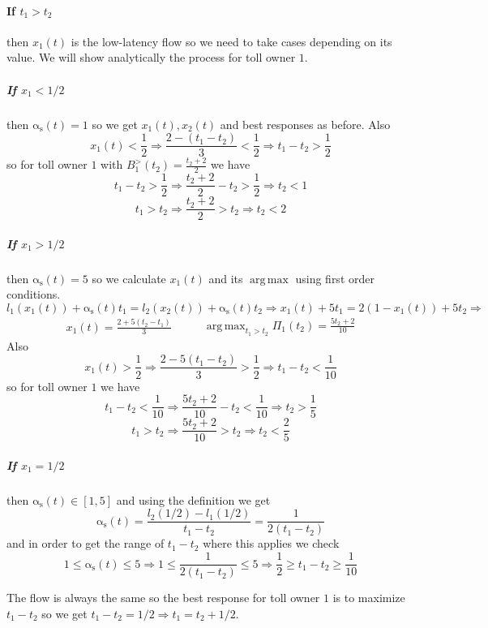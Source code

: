 \documentclass[10pt,a4paper]{book}
\newcommand{\as}{\mathrm{\alpha_s}}
\DeclareMathOperator*{\argmax}{arg\,max}
\theoremstyle{definition}
\theoremstyle{comment}
\begin{document}
\paragraph{If $t_1 > t_2$} then $x_1(t)$ is the low-latency flow so we need to take cases depending on its value.
We will show analytically the process for toll owner $1$.

\subparagraph{If $x_1 < 1/2$} then $\as(t) = 1$ so we get $x_1(t), x_2(t)$ and best responses as before.
Also
\[x_1(t) < \frac12 \Rightarrow \frac{2 - (t_1 - t_2)}{3} < \frac12 \Rightarrow t_1 - t_2 > \frac12\]
so for toll owner $1$ with $B_1^>(t_2) = \frac{t_2 + 2}2$ we have
\[t_1 - t_2 > \frac12 \Rightarrow \frac{t_2 + 2}2 - t_2 > \frac12 \Rightarrow t_2 < 1\]
\[t_1 > t_2 \Rightarrow \frac{t_2 + 2}2 > t_2 \Rightarrow t_2 < 2\]

\subparagraph{If $x_1 > 1/2$} then $\as(t) = 5$ so we calculate $x_1(t)$ and its $\argmax$ using first order conditions.
\[
	l_1(x_1(t)) + \as(t) t_1 = l_2(x_2(t)) + \as(t) t_2 \Rightarrow	x_1(t) + 5 t_1 = 2 (1 - x_1(t)) + 5 t_2 \Rightarrow
\]
\begin{equation*}
	\begin{aligned}
		x_1(t) = \frac{2 + 5 (t_2 - t_1)}3
	\end{aligned}
	\qquad
	\begin{aligned}
		\argmax_{t_1 > t_2}\Pi_1(t_2) = \frac{5 t_2 + 2}{10}
	\end{aligned}
\end{equation*}
Also
\[x_1(t) > \frac12 \Rightarrow \frac{2 - 5 (t_1 - t_2)}{3} > \frac12 \Rightarrow t_1 - t_2 < \frac1{10}\]
so for toll owner $1$ we have
\[t_1 - t_2 < \frac1{10} \Rightarrow \frac{5 t_2 + 2}{10} - t_2 < \frac1{10} \Rightarrow t_2 > \frac15\]
\[t_1 > t_2 \Rightarrow \frac{5 t_2 + 2}{10} > t_2 \Rightarrow t_2 < \frac25\]

\subparagraph{If $x_1 = 1/2$} then $\as(t) \in [1, 5]$ and using the definition we get
\[\as(t) = \frac{l_2(1/2) - l_1(1/2)}{t_1 - t_2} = \frac1{2 (t_1 - t_2)}\]
and in order to get the range of $t_1 - t_2$ where this applies we check
\[1 \le \as(t) \le 5 \Rightarrow 1 \le \frac1{2 (t_1 - t_2)} \le 5 \Rightarrow \frac12 \ge t_1 - t_2 \ge \frac1{10}\]

The flow is always the same so the best response for toll owner $1$ is to maximize $t_1 - t_2$ so we get $t_1 - t_2 = 1/2 \Rightarrow t_1 = t_2 + 1/2$.
\end{document}
